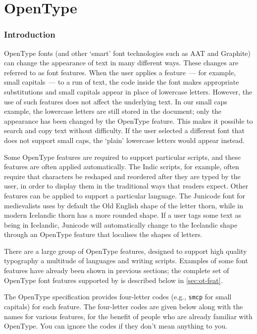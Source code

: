 

\part{OpenType}
\label{sec:opentype-features}

\section{Introduction}
\label{sec:opentype-features-intro}

OpenType fonts (and other `smart' font technologies such as AAT and Graphite) can change the appearance of text in many different ways.
These changes are referred to as font features.
When the user applies a feature~--- for example, small capitals~--- to a run of text, the code inside the font makes appropriate substitutions and small capitals appear in place of lowercase letters.
However, the use of such features does not affect the underlying text.
In our small caps example, the lowercase letters are still stored in the document; only the appearance has been changed by the OpenType feature.
This makes it possible to search and copy text without difficulty.
If the user selected a different font that does not support small caps, the `plain' lowercase letters would appear instead.

Some OpenType features are required to support particular scripts, and these features are often applied automatically.
The Indic scripts, for example, often require that characters be reshaped and reordered after they are typed by the user, in order to display them in the traditional ways that readers expect.
Other features can be applied to support a particular language.
The Junicode font for medievalists uses by default the Old English shape of the letter thorn, while in modern Icelandic thorn has a more rounded shape.
If a user tags some text as being in Icelandic, Junicode will automatically change to the Icelandic shape through an OpenType feature that localises the shapes of letters.

There are a large group of OpenType features, designed to support high quality typography a multitude of languages and writing scripts.
Examples of some font features have already been shown in previous sections; the complete set of OpenType font features supported by  is described below in \ref{sec:ot-feat}.

The OpenType specification provides four-letter codes (e.g., \texttt{smcp} for small capitals) for each feature.  The four-letter codes are given below along with the  names for various features, for the benefit of people who are already familiar with OpenType.  You can ignore the codes if they don't mean anything to you.



